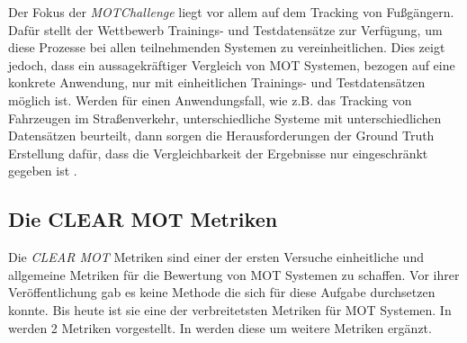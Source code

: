 Der Fokus der \textit{MOTChallenge} liegt vor allem auf dem \gls{Tracking} von Fußgängern. Dafür stellt der Wettbewerb Trainings- und Testdatensätze zur Verfügung, um diese Prozesse bei allen teilnehmenden Systemen zu vereinheitlichen. Dies zeigt jedoch, dass ein aussagekräftiger Vergleich von \gls{MOT} Systemen, bezogen auf eine konkrete Anwendung, nur mit einheitlichen Trainings- und Testdatensätzen möglich ist. Werden für einen Anwendungsfall, wie z.B. das \gls{Tracking} von Fahrzeugen im Straßenverkehr, unterschiedliche Systeme mit unterschiedlichen Datensätzen beurteilt, dann sorgen die Herausforderungen der \gls{Ground Truth} Erstellung dafür, dass die Vergleichbarkeit der Ergebnisse nur eingeschränkt gegeben ist \cite{MOT15}. 

\subsection{Die CLEAR MOT Metriken} \label{sec:MOT MOTA}
Die \textit{\acrshort{CLEAR} \gls{MOT}} Metriken sind einer der ersten Versuche einheitliche und allgemeine Metriken für die Bewertung von \gls{MOT} Systemen zu schaffen. Vor ihrer Veröffentlichung gab es keine Methode die sich für diese Aufgabe durchsetzen konnte. Bis heute ist sie eine der verbreitetsten Metriken für \gls{MOT} Systemen. In \cite{CLEAR.2008} werden 2 Metriken vorgestellt. In \cite{Kasturi.2009} werden diese um weitere Metriken ergänzt. \par

